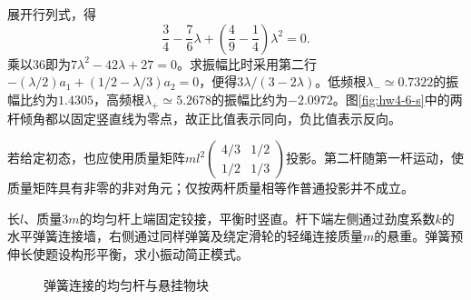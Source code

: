 \begin{solution}
展开行列式，得
\[
 \frac34-\frac76\lambda+\left(\frac49-\frac14\right)\lambda^2=0.
\]
乘以36即为$7\lambda^2-42\lambda+27=0$。求振幅比时采用第二行$-(\lambda/2)a_1+(1/2-\lambda/3)a_2=0$，便得$3\lambda/(3-2\lambda)$。低频根$\lambda_-\simeq0.7322$的振幅比约为$1.4305$，高频根$\lambda_+\simeq5.2678$的振幅比约为$-2.0972$。图\ref{fig:hw4-6-s}中的两杆倾角都以固定竖直线为零点，故正比值表示同向，负比值表示反向。

若给定初态，也应使用质量矩阵$ml^2\left(\begin{smallmatrix}4/3&1/2\\1/2&1/3\end{smallmatrix}\right)$投影。第二杆随第一杆运动，使质量矩阵具有非零的非对角元；仅按两杆质量相等作普通投影并不成立。

\end{solution}



\begin{example}[摆杆、弹簧与悬重的耦合]\label{ex:hw4-7}

长$l$、质量$3m$的均匀杆上端固定铰接，平衡时竖直。杆下端左侧通过劲度系数$k$的水平弹簧连接墙，右侧通过同样弹簧及绕定滑轮的轻绳连接质量$m$的悬重。弹簧预伸长使题设构形平衡，求小振动简正模式。

\end{example}


\begin{figure}[H]\centering
{}
\caption{弹簧连接的均匀杆与悬挂物块}\label{fig:hw4-7-q}
\end{figure}

